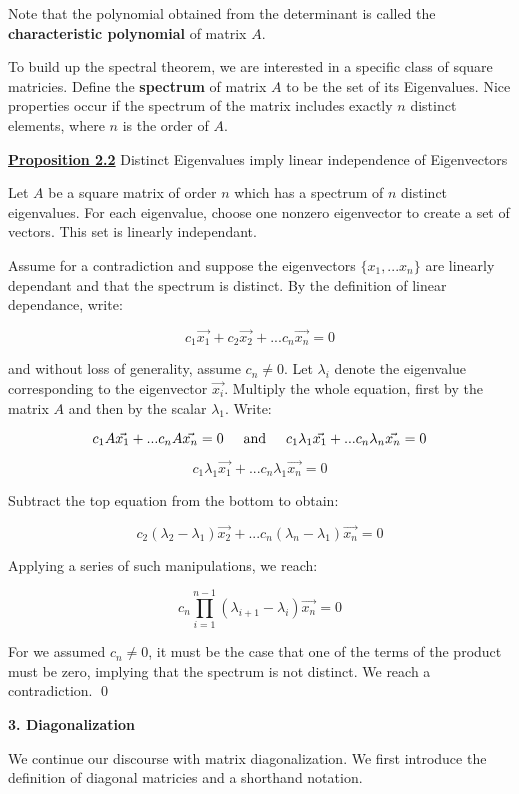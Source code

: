 \documentclass{article}
\newcommand{\new}[1]{
    \vspace{2mm}
    \noindent
    \textbf{
    \underline{#1}}
}
\newcommand{\textAnd}{
    {
        \hspace{5mm}
        \textrm{and}
        \hspace{5mm}
    }
}
\begin{document}
Note that the polynomial obtained from the determinant is called 
the \textbf{characteristic polynomial} of matrix $A$. 

To build up the spectral theorem, we are interested in a specific class 
of square matricies. Define the \textbf{spectrum} of matrix $A$ 
to be the set of its Eigenvalues. Nice properties occur if the spectrum 
of the matrix includes exactly $n$ distinct elements, where $n$ 
is the order of $A$. 

\new{Proposition 2.2} Distinct Eigenvalues imply linear independence of Eigenvectors 

Let $A$ be a square matrix of order $n$ which has a spectrum of 
$n$ distinct eigenvalues. For each eigenvalue, choose one nonzero 
eigenvector to create a set of vectors. This set is linearly independant. 

\proof Assume for a contradiction and suppose the eigenvectors 
$\{x_1, ... x_n\}$ are linearly dependant and that 
the spectrum is distinct. By the definition of 
linear dependance, write:

\[
    c_1 \vec{x_1}+c_2\vec{x_2}+ ... c_n\vec{x_n} = 0
\]

and without loss of generality, assume $c_n \neq 0$. 
Let $\lambda_i$ denote the eigenvalue corresponding to the 
eigenvector $\vec{x_i}$. 
Multiply the whole equation, first by the matrix $A$ and 
then by the scalar $\lambda_1$. Write:

\[
    c_1A\vec{x_1} + ... c_nA\vec{x_n} = 0
    \textAnd
    c_1\lambda_1\vec{x_1} + ... c_n\lambda_n\vec{x_n} = 0
\]

\[
    c_1\lambda_1\vec{x_1} + ... c_n\lambda_1\vec{x_n} = 0
\]

Subtract the top equation from the bottom to obtain:

\[
    c_2( \lambda_2 - \lambda_1 ) \vec{x_2}
    + ... 
c_n( \lambda_n - \lambda_1 ) \vec{x_n} = 0
\]

Applying a series of such manipulations, we reach:

\[
    c_n\prod_{i = 1}^{n - 1} (\lambda_{i + 1} - \lambda_i) \vec{x_n} = 0
\]

For we assumed $c_n \neq 0$, it must be the case that 
one of the terms of the product must be zero, implying that 
the spectrum is not distinct. We reach a contradiction. 
\qed

\vspace{15mm}

\textbf{3. Diagonalization}

We continue our discourse with matrix diagonalization. We 
first introduce the definition of diagonal matricies 
and a shorthand notation.
\end{document}
